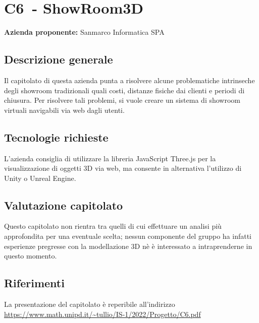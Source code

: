 
\renewcommand{\capName}{ShowRoom3D} %
\renewcommand{\capCode}{C6} %
\renewcommand{\capLink}{https://www.math.unipd.it/~tullio/IS-1/2022/Progetto/C6.pdf} %
\renewcommand{\capProposer}{SanMarco Informatica} %


\section{\capCode\ - \capName}
\textbf{Azienda proponente:} Sanmarco Informatica SPA
\subsection{Descrizione generale}
Il capitolato di questa azienda punta a risolvere alcune problematiche intrinseche degli showroom tradizionali quali costi, distanze fisiche dai clienti e periodi di chiusura. Per risolvere tali problemi, si vuole creare un sistema di showroom virtuali navigabili via web dagli utenti.

\subsection{Tecnologie richieste}
L'azienda consiglia di utilizzare la libreria JavaScript Three.js per la visualizzazione di oggetti 3D via web, ma consente in alternativa l'utilizzo di Unity o Unreal Engine.

\subsection{Valutazione capitolato}
Questo capitolato non rientra tra quelli di cui effettuare un analisi più approfondita per una eventuale scelta; nessun componente del gruppo ha infatti esperienze pregresse con la modellazione 3D nè è interessato a intraprenderne in questo momento.

\subsection{Riferimenti}
La presentazione del capitolato è reperibile all'indirizzo \url{\capLink}